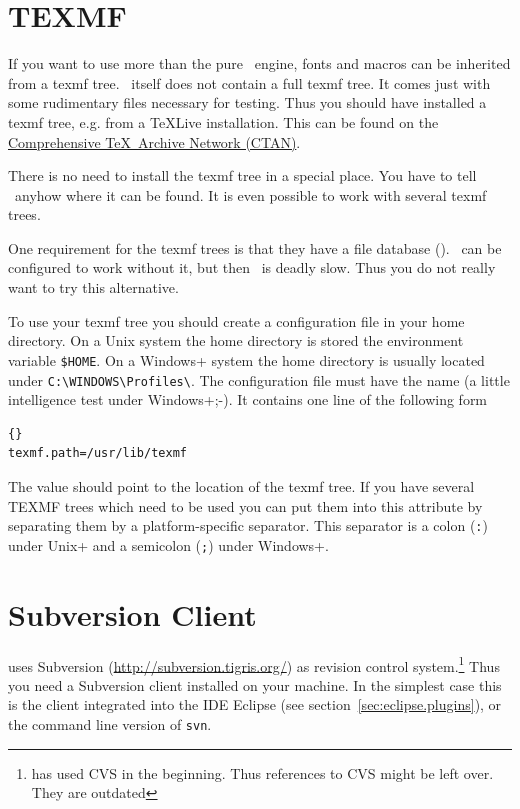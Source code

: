 \section{TEXMF}

If you want to use more than the pure \ExTeX\ engine, fonts and macros
can be inherited from a texmf tree. \ExTeX\ itself does
not contain a full texmf tree. It comes just with some rudimentary
files necessary for testing. Thus you should have installed a texmf
tree, e.g. from a \TeX Live installation.
This can be found on the \href{http://www.ctan.org}{Comprehensive
  \TeX\ Archive Network (CTAN)}.

There is no need to install the texmf tree in a special place. You
have to tell \ExTeX\ anyhow where it can be found. It is even possible
to work with several texmf trees.

One requirement for the texmf trees is that they have a file database
(). \ExTeX\ can be configured to work without it, but then
\ExTeX\ is deadly slow. Thus you do not really want to try this
alternative.

To use your texmf tree you should create a configuration file in your
home directory. On a Unix system the home directory is
stored the environment variable
\verb|$HOME|. On a \+Windows+ system the
home directory is usually located under \verb|C:\WINDOWS\Profiles\|.
The configuration file must have the name  (a little
intelligence test under \+Windows+;-). It contains one line of the
following form

\begin{lstlisting}{}
texmf.path=/usr/lib/texmf
\end{lstlisting}

The value should point to the location of the texmf tree. If you have
several TEXMF trees which need to be used you can put them into this
attribute by separating them by a platform-specific separator. This
separator is a colon (\verb|:|) under \+Unix+ and a semicolon
(\verb|;|) under \+Windows+. 

\section{Subversion Client}

\ExTeX{} uses Subversion (\url{http://subversion.tigris.org/}) as revision
control system.\footnote{\ExTeX{} has used CVS in the beginning.
  Thus references to CVS might be left over. They are outdated} Thus you need
a Subversion client installed on your machine. In the simplest case this is
the client integrated into the IDE Eclipse (see
section~\ref{sec:eclipse.plugins}), or the command line version of
\texttt{svn}.


